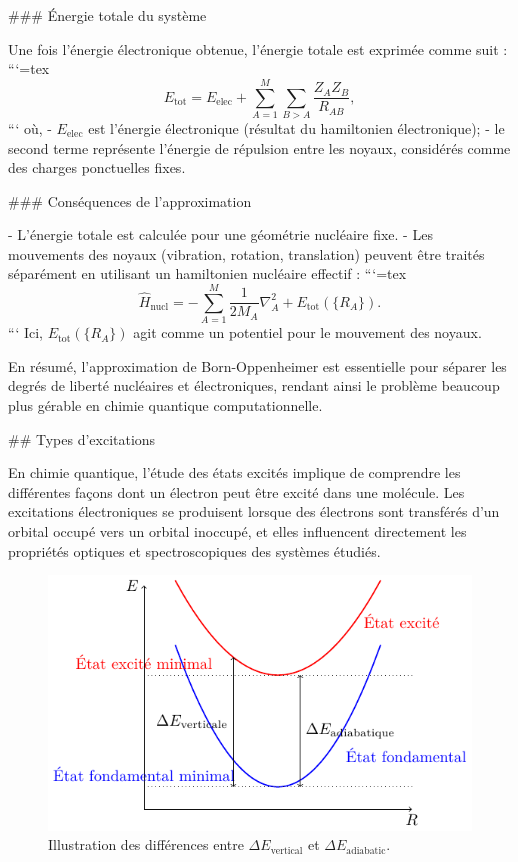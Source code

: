 \documentclass[12pt,a4paper]{report}
\begin{document}
\begin{markdown}
### Énergie totale du système

Une fois l'énergie électronique obtenue, l'énergie totale est exprimée comme suit :
```{=tex}
\[
E_{\text{tot}} = E_{\text{elec}} + \sum_{A=1}^M \sum_{B>A} \frac{Z_A Z_B}{R_{AB}},
\]
```
où,
- \(E_{\text{elec}}\) est l'énergie électronique (résultat du hamiltonien électronique);
- le second terme représente l'énergie de répulsion entre les noyaux, considérés comme des charges ponctuelles fixes.

### Conséquences de l'approximation

- L'énergie totale est calculée pour une géométrie nucléaire fixe.
- Les mouvements des noyaux (vibration, rotation, translation) peuvent être traités séparément en utilisant un hamiltonien nucléaire effectif :
```{=tex}
\[
\hat{H}_{\text{nucl}} = -\sum_{A=1}^M \frac{1}{2M_A} \nabla_A^2 + E_{\text{tot}}(\{R_A\}) .
\]
```
Ici, \(E_{\text{tot}}(\{R_A\})\) agit comme un potentiel pour le mouvement des noyaux.

En résumé, l'approximation de Born-Oppenheimer est essentielle pour séparer les degrés de liberté nucléaires et électroniques, rendant ainsi le problème beaucoup plus gérable en chimie quantique computationnelle.


## Types d'excitations

En chimie quantique, l'étude des états excités implique de comprendre les différentes façons dont un électron peut être excité dans une molécule. Les excitations électroniques se produisent lorsque des électrons sont transférés d'un orbital occupé vers un orbital inoccupé, et elles influencent directement les propriétés optiques et spectroscopiques des systèmes étudiés.

\begin{figure}[htpb]
\centering
\includegraphics[width=0.7\linewidth]{Graphics/Excited_states}
\caption{Illustration des différences entre \(\Delta E_{\text{vertical}}\) et \(\Delta E_{\text{adiabatic}}\).}
\label{fig:excitedstates}
\end{figure}


\end{markdown}
\end{document}
